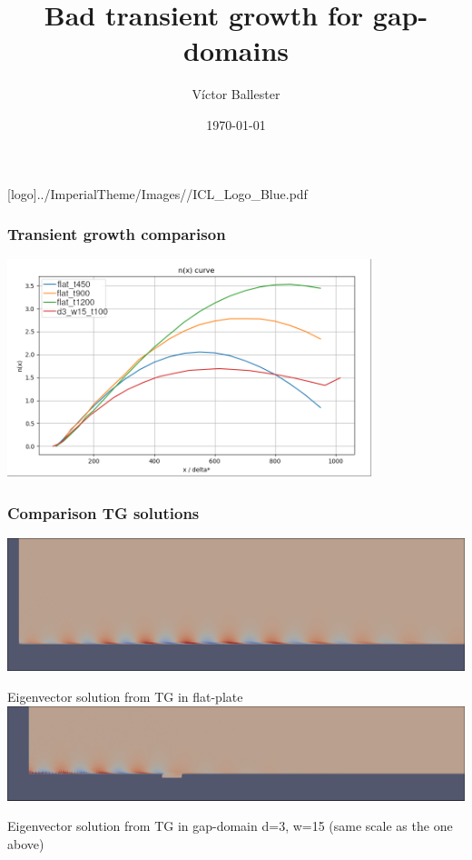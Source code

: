 \documentclass[
  aspectratio=169, %
  t, %
  onlytextwidth, %
  10pt, %
]{beamer}
\title{Bad transient growth for gap-domains} %
\subtitle{} %
\author{Víctor Ballester} %
\date{\today} %
\def\imagefolder{../ImperialTheme/Images/}
\begin{document}
\begingroup
{} %
[logo]{\imagefolder/ICL_Logo_Blue.pdf} %
\frame[plain, s]{\titlepage} %
\endgroup

\begin{frame}
	\frametitle{Transient growth comparison}
	\centering
	\includegraphics[width=0.8\textwidth]{Images/tgcomparison.png}

\end{frame}
\begin{frame}
	\frametitle{Comparison TG solutions}
	\centering
	\centering
	\includegraphics[width=0.7\linewidth]{Images/tg_flat.png}

	Eigenvector solution from TG in flat-plate
	\includegraphics[width=0.7\linewidth]{Images/tg_d3_w15.png}

	Eigenvector solution from TG in gap-domain d=3, w=15 (same scale as the one above)
\end{frame}
\end{document}
